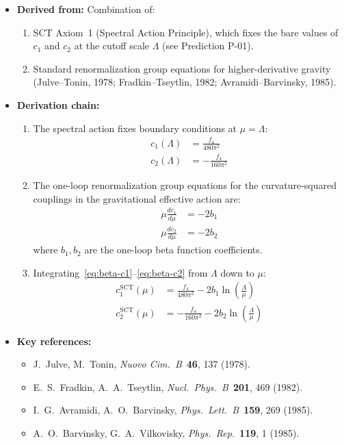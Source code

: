 \documentclass[11pt,a4paper]{article}
\begin{document}
\begin{itemize}[leftmargin=2em]
  \item \textbf{Derived from:} Combination of:
    \begin{enumerate}
      \item SCT Axiom~1 (Spectral Action Principle), which fixes the bare values of $c_1$ and $c_2$ at the cutoff scale $\Lambda$ (see Prediction P-01).
      \item Standard renormalization group equations for higher-derivative gravity (Julve--Tonin, 1978; Fradkin--Tseytlin, 1982; Avramidi--Barvinsky, 1985).
    \end{enumerate}
  \item \textbf{Derivation chain:}
    \begin{enumerate}
      \item The spectral action fixes boundary conditions at $\mu = \Lambda$:
        \begin{align}
          c_1(\Lambda) &= \frac{f_4}{480\pi^2} \label{eq:c1-boundary}\\
          c_2(\Lambda) &= -\frac{f_4}{160\pi^2} \label{eq:c2-boundary}
        \end{align}
      \item The one-loop renormalization group equations for the curvature-squared couplings in the gravitational effective action are:
        \begin{align}
          \mu\frac{d c_1}{d\mu} &= -2b_1 \label{eq:beta-c1}\\
          \mu\frac{d c_2}{d\mu} &= -2b_2 \label{eq:beta-c2}
        \end{align}
        where $b_1, b_2$ are the one-loop beta function coefficients.
      \item Integrating~\eqref{eq:beta-c1}--\eqref{eq:beta-c2} from $\Lambda$ down to $\mu$:
        \begin{align}
          c_1^{\text{SCT}}(\mu) &= \frac{f_4}{480\pi^2} - 2b_1\ln\!\left(\frac{\Lambda}{\mu}\right) \label{eq:c1-running}\\
          c_2^{\text{SCT}}(\mu) &= -\frac{f_4}{160\pi^2} - 2b_2\ln\!\left(\frac{\Lambda}{\mu}\right) \label{eq:c2-running}
        \end{align}
    \end{enumerate}
  \item \textbf{Key references:}
    \begin{itemize}
      \item J.~Julve, M.~Tonin, \textit{Nuovo Cim.\ B}~\textbf{46}, 137 (1978).
      \item E.~S.~Fradkin, A.~A.~Tseytlin, \textit{Nucl.\ Phys.\ B}~\textbf{201}, 469 (1982).
      \item I.~G.~Avramidi, A.~O.~Barvinsky, \textit{Phys.\ Lett.\ B}~\textbf{159}, 269 (1985).
      \item A.~O.~Barvinsky, G.~A.~Vilkovisky, \textit{Phys.\ Rep.}~\textbf{119}, 1 (1985).
    \end{itemize}
\end{itemize}
\end{document}
